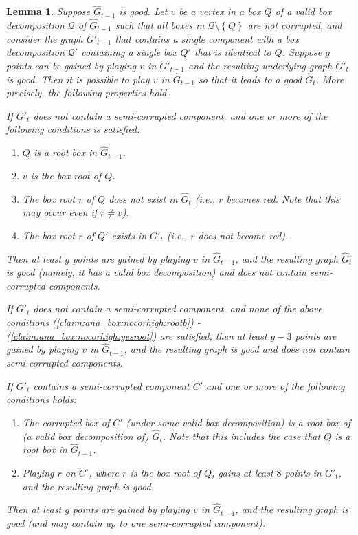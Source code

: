 \documentclass[11pt]{article}
\def\dnsitem{\vspace{-7pt}\item}
\def\dnssubitem{\vspace{-5pt}\item}
\newtheorem{lemma}[theorem]{Lemma}
\theoremstyle{definition}
\def\boxpropnocorhigh{\mathcal{C}_1}
\def\boxpropnocorlow{\mathcal{C}_2}
\def\boxpropcor{\mathcal{C}_3}
\begin{document}
\begin{lemma}
\label{claim:ana_box}
Suppose $\hat{G}_{t-1}$ is good.
Let $v$ be a vertex in a box $Q$ of a valid box decomposition $\mathcal{Q}$ of $\hat{G}_{t-1}$ such that all boxes in $\mathcal{Q} \setminus \left\{Q\right\}$ are not corrupted, 
and consider the graph $G'_{t-1}$ that contains a single component with a box decomposition $\mathcal{Q}'$ containing a single box $Q'$ that is identical to $Q$.
Suppose $g$ points can be gained by playing $v$ in $G'_{t-1}$ and the resulting underlying graph $G'_t$ is good. 
Then it is possible to play $v$ in $\hat{G}_{t-1}$ so that it leads to a good $\hat{G}_t$.
More precisely, the following properties hold.
\begin{description}
	\dnsitem[$\boxpropnocorhigh$.]
	If $G'_t$ does not contain a semi-corrupted component, and one or more of the following conditions is satisfied:
	\begin{enumerate}
		\dnsitem 
		\label{claim:ana_box:nocorhigh:rootb}
		$Q$ is a root box in $\hat{G}_{t-1}$.
		\dnssubitem 
		\label{claim:ana_box:nocorhigh:boxr}
		$v$ is the box root of $Q$.
		\dnssubitem 
		\label{claim:ana_box:nocorhigh:nodense}
		The box root $r$ of $Q$ does not exist in $\hat{G}_t$ (i.e., $r$ becomes red. Note that this may occur even if $r \neq v$).
		\dnssubitem 
		\label{claim:ana_box:nocorhigh:yesroot}
		The box root $r$ of $Q'$ exists in $G'_t$ (i.e., $r$ does not become red).
	\end{enumerate}
	Then at least $g$ points are gained by playing $v$ in $\hat{G}_{t-1}$,
	 and the resulting graph $\hat{G}_t$ is good (namely, it has a valid box decomposition) and does not contain semi-corrupted components.
	
	\dnsitem[$\boxpropnocorlow$.]
	If $G'_t$ does not contain a semi-corrupted component, and none of the above conditions (\ref{claim:ana_box:nocorhigh:rootb}) - (\ref{claim:ana_box:nocorhigh:yesroot}) are satisfied,
	then at least $g - 3$ points are gained by playing $v$ in $\hat{G}_{t-1}$, 
	and the resulting graph is good and does not contain semi-corrupted components.

	\dnsitem[$\boxpropcor$.]
	If $G'_t$ contains a semi-corrupted component $C'$ and one or more of the following conditions holds:
	\begin{enumerate}
		\dnsitem The corrupted box of $C'$ (under some valid box decomposition) is a root box of (a valid box decomposition of) $\hat{G}_t$. Note that this includes the case that $Q$ is a root box in $\hat{G}_{t-1}$.
		\dnssubitem Playing $r$ on $C'$, where $r$ is the box root of $Q$, gains at least $8$ points in $G'_t$, and the resulting graph is good.
			\end{enumerate}
	Then at least $g$ points are gained by playing $v$ in $\hat{G}_{t-1}$,
	 and the resulting graph is good (and may contain up to one semi-corrupted component).
\end{description}
\end{lemma}
\end{document}
